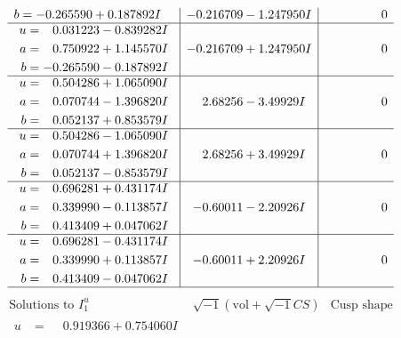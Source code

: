 \documentclass[1p]{elsarticle_modified}
\theoremstyle{definition}
\newcommand{\I}{\sqrt{-1}}
\begin{document}
$$\begin{array}{c|c|c}
\begin{aligned}
b &= -0.265590 + 0.187892 I\end{aligned}
 & -0.216709 - 1.247950 I & \phantom{-0.000000 } 0 \\ \hline\begin{aligned}
u &= \phantom{-}0.031223 - 0.839282 I \\
a &= \phantom{-}0.750922 + 1.145570 I \\
b &= -0.265590 - 0.187892 I\end{aligned}
 & -0.216709 + 1.247950 I & \phantom{-0.000000 } 0 \\ \hline\begin{aligned}
u &= \phantom{-}0.504286 + 1.065090 I \\
a &= \phantom{-}0.070744 - 1.396820 I \\
b &= \phantom{-}0.052137 + 0.853579 I\end{aligned}
 & \phantom{-}2.68256 - 3.49929 I & \phantom{-0.000000 } 0 \\ \hline\begin{aligned}
u &= \phantom{-}0.504286 - 1.065090 I \\
a &= \phantom{-}0.070744 + 1.396820 I \\
b &= \phantom{-}0.052137 - 0.853579 I\end{aligned}
 & \phantom{-}2.68256 + 3.49929 I & \phantom{-0.000000 } 0 \\ \hline\begin{aligned}
u &= \phantom{-}0.696281 + 0.431174 I \\
a &= \phantom{-}0.339990 - 0.113857 I \\
b &= \phantom{-}0.413409 + 0.047062 I\end{aligned}
 & -0.60011 - 2.20926 I & \phantom{-0.000000 } 0 \\ \hline\begin{aligned}
u &= \phantom{-}0.696281 - 0.431174 I \\
a &= \phantom{-}0.339990 + 0.113857 I \\
b &= \phantom{-}0.413409 - 0.047062 I\end{aligned}
 & -0.60011 + 2.20926 I & \phantom{-0.000000 } 0\\
 \hline 
 \end{array}$$\newpage$$\begin{array}{c|c|c}  
\text{Solutions to }I^u_{1}& \I (\text{vol} + \sqrt{-1}CS) & \text{Cusp shape}\\
 \hline 
\begin{aligned}
u &= \phantom{-}0.919366 + 0.754060 I \\

\end{aligned}
\end{array}$$
\end{document}
